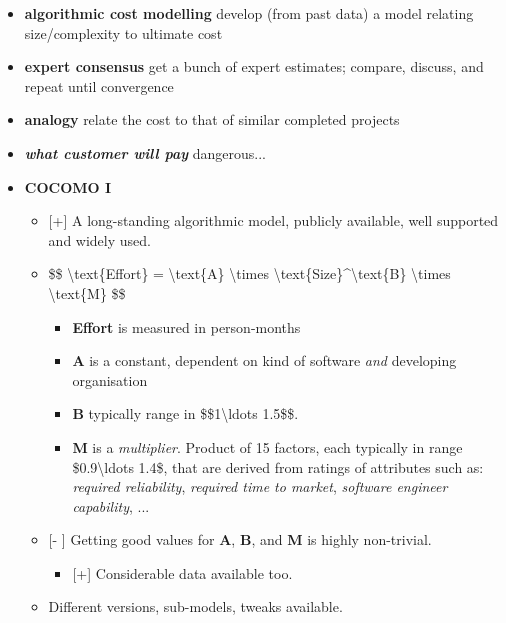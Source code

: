 \documentclass[a4paper]{article}
\providecommand{\tightlist}{%
  \setlength{\itemsep}{0pt}\setlength{\parskip}{0pt}}
\begin{document}
\begin{itemize}
\item
  \textbf{algorithmic cost modelling} develop (from past data) a model
  relating size/complexity to ultimate cost
\item
  \textbf{expert consensus} get a bunch of expert estimates; compare,
  discuss, and repeat until convergence
\item
  \textbf{analogy} relate the cost to that of similar completed projects
\item
  \emph{\textbf{what customer will pay}} dangerous...
\item
  \textbf{COCOMO I}

  \begin{itemize}
  \tightlist
  \item
    {[}+{]} A long-standing algorithmic model, publicly available, well
    supported and widely used.
  \item
    \$\$ \textbackslash{}text\{Effort\} = \textbackslash{}text\{A\}
    \textbackslash{}times
    \textbackslash{}text\{Size\}\^{}\textbackslash{}text\{B\}
    \textbackslash{}times \textbackslash{}text\{M\} \$\$

    \begin{itemize}
    \tightlist
    \item
      \textbf{Effort} is measured in person-months
    \item
      \textbf{A} is a constant, dependent on kind of software \emph{and}
      developing organisation
    \item
      \textbf{B} typically range in \$\$1\textbackslash{}ldots 1.5\$\$.
    \item
      \textbf{M} is a \emph{multiplier}. Product of 15 factors, each
      typically in range \$0.9\textbackslash{}ldots 1.4\$, that are
      derived from ratings of attributes such as: \emph{required
      reliability}, \emph{required time to market}, \emph{software
      engineer capability}, ...
    \end{itemize}
  \item
    {[}- {]} Getting good values for \textbf{A}, \textbf{B}, and
    \textbf{M} is highly non-trivial.

    \begin{itemize}
    \tightlist
    \item
      {[}+{]} Considerable data available too.
    \end{itemize}
  \item
    Different versions, sub-models, tweaks available.
  \end{itemize}
\end{itemize}
\end{document}
